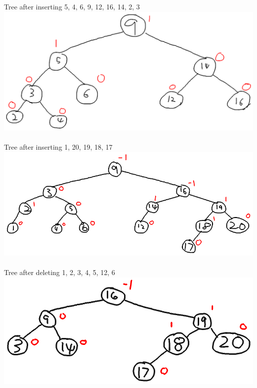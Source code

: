 \documentclass[12pt]{article}
\begin{document}
\begin{center}
  \def \imageWidth {5.7in}
	Tree after inserting 5, 4, 6, 9, 12, 16, 14, 2, 3\\
  \includegraphics[width=\imageWidth]{CSCB63_A1_4a.png}\\\ \\
  
	Tree after inserting 1, 20, 19, 18, 17\\
  \includegraphics[width=\imageWidth]{CSCB63_A1_4b.png}\\\ \\

  Tree after deleting 1, 2, 3, 4, 5, 12, 6\\
  \includegraphics[width=\imageWidth]{CSCB63_A1_4c.png}
\end{center}
\newpage


\end{document}
